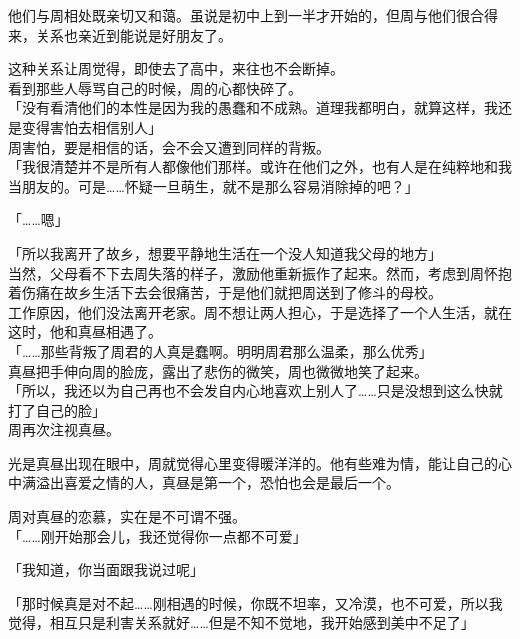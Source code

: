 他们与周相处既亲切又和蔼。虽说是初中上到一半才开始的，但周与他们很合得来，关系也亲近到能说是好朋友了。

这种关系让周觉得，即使去了高中，来往也不会断掉。\\

看到那些人辱骂自己的时候，周的心都快碎了。\\

「没有看清他们的本性是因为我的愚蠢和不成熟。道理我都明白，就算这样，我还是变得害怕去相信别人」\\

周害怕，要是相信的话，会不会又遭到同样的背叛。\\

「我很清楚并不是所有人都像他们那样。或许在他们之外，也有人是在纯粹地和我当朋友的。可是……怀疑一旦萌生，就不是那么容易消除掉的吧？」

「……嗯」

「所以我离开了故乡，想要平静地生活在一个没人知道我父母的地方」\\

当然，父母看不下去周失落的样子，激励他重新振作了起来。然而，考虑到周怀抱着伤痛在故乡生活下去会很痛苦，于是他们就把周送到了修斗的母校。\\

工作原因，他们没法离开老家。周不想让两人担心，于是选择了一个人生活，就在这时，他和真昼相遇了。\\

「……那些背叛了周君的人真是蠢啊。明明周君那么温柔，那么优秀」\\

真昼把手伸向周的脸庞，露出了悲伤的微笑，周也微微地笑了起来。\\

「所以，我还以为自己再也不会发自内心地喜欢上别人了……只是没想到这么快就打了自己的脸」\\

周再次注视真昼。

光是真昼出现在眼中，周就觉得心里变得暖洋洋的。他有些难为情，能让自己的心中满溢出喜爱之情的人，真昼是第一个，恐怕也会是最后一个。

周对真昼的恋慕，实在是不可谓不强。\\

「……刚开始那会儿，我还觉得你一点都不可爱」

「我知道，你当面跟我说过呢」

「那时候真是对不起……刚相遇的时候，你既不坦率，又冷漠，也不可爱，所以我觉得，相互只是利害关系就好……但是不知不觉地，我开始感到美中不足了」\\

